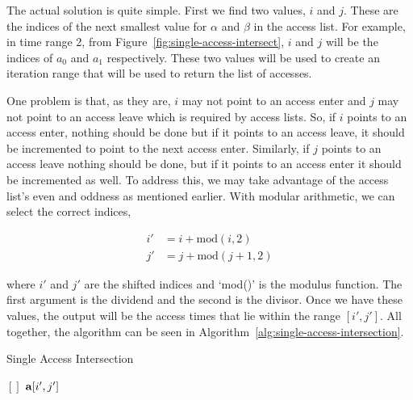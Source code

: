 The actual solution is quite simple. First we find two values, $i$ and $j$.
These are the indices of the next smallest value for $\alpha$ and $\beta$ in
the access list. For example, in time range 2, from
Figure~\ref{fig:single-access-intersect}, $i$ and $j$ will be the indices of
$a_0$ and $a_1$ respectively. These two values will be used to create an
iteration range that will be used to return the list of accesses. 

One problem is that, as they are, $i$ may not point to an access enter and $j$
may not point to an access leave which is required by access lists. So, if $i$
points to an access enter, nothing should be done but if it points to an access
leave, it should be incremented to point to the next access enter. Similarly,
if $j$ points to an access leave nothing should be done, but if it points to an
access enter it should be incremented as well.  To address this, we may take
advantage of the access list's even and oddness as mentioned earlier.  With
modular arithmetic, we can select the correct indices,

\begin{align*}
    i' &= i + \mathrm{mod}(i,2) \\
    j' &= j + \mathrm{mod}(j+1,2)
\end{align*}

where $i'$ and $j'$ are the shifted indices and `mod()' is the modulus
function.  The first argument is the dividend and the second is the divisor.
Once we have these values, the output will be the access times that lie within
the range $[i', j']$. All together, the algorithm can be seen in
Algorithm~\ref{alg:single-access-intersection}.


\begin{algorithm}[h] 
    \caption{Single Access Intersection}
    \label{alg:single-access-intersection} 
    \begin{algorithmic}[1]

	 

	 
	    \EndIf
	    \EndIf
	\EndFor


	    \State \Return $[]$ 
	\Else
	    \State \Return $\bm{\mathrm{a}}[i',j']$ 
	\EndIf
	\EndFunction
    \end{algorithmic}
\end{algorithm}

